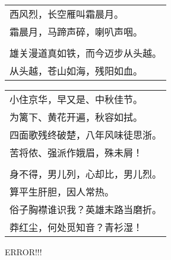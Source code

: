 \nopagebreak%
\nopagebreak%
\noindent\begin{minipage}{\linewidth}
  \vskip-3pt\begin{table}[H]
    \centering
    \begin{tabular}{@{}l@{}}
西风烈，长空雁叫霜晨月。\\
霜晨月，马蹄声碎，喇叭声咽。\\
\\
雄关漫道真如铁，而今迈步从头越。\\
从头越，苍山如海，残阳如血。
    \end{tabular}
  \end{table}
\end{minipage}
\vspace{1cm}


\nopagebreak%
\nopagebreak%
\noindent\begin{minipage}{\linewidth}
  \vskip-3pt\begin{table}[H]
    \centering
    \begin{tabular}{@{}l@{}}
小住京华，早又是、中秋佳节。\\
为篱下、黄花开遍，秋容如拭。\\
四面歌残终破楚，八年风味徒思浙。\\
苦将侬、强派作娥眉，殊未屑！\\
\\
身不得，男儿列，心却比，男儿烈。\\
算平生肝胆，因人常热。\\
俗子胸襟谁识我？英雄末路当磨折。\\
莽红尘，何处觅知音？青衫湿！
    \end{tabular}
  \end{table}
\end{minipage}
\vspace{1cm}


ERROR!!!
